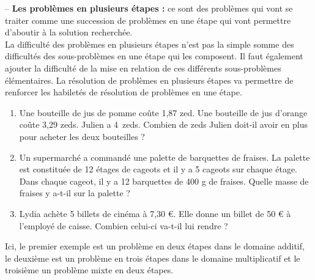    -- {\bf Les problèmes en plusieurs étapes :} ce sont des problèmes qui vont se traiter comme une succession de problèmes en une étape qui vont permettre d’aboutir à la solution recherchée. \\
      La difficulté des problèmes en plusieurs étapes n’est pas la simple somme des difficultés des sous-problèmes en une étape qui les composent. Il faut également ajouter la difficulté de la mise en relation de ces différents sous-problèmes élémentaires. La résolution de problèmes en plusieurs étapes va permettre de renforcer les habiletés de résolution de problèmes en une étape.
      \begin{exemple*1}
         {\small
         \begin{enumerate}
            \item Une bouteille de jus de pomme coûte 1,87 zed. Une bouteille de jus d’orange coûte 3,29 zeds. Julien a 4~zeds. Combien de zeds Julien doit-il avoir en plus pour acheter les deux bouteilles ?
            \item Un supermarché a commandé une palette de barquettes de fraises. La palette est constituée de 12 étages de cageots et il y a 5 cageots sur chaque étage. Dans chaque cageot, il y a 12 barquettes de 400 g de fraises. Quelle masse de fraises y a-t-il sur la palette ?
            \item Lydia achète 5 billets de cinéma à 7,30 \euro. Elle donne un billet de 50 \euro{} à l’employé de caisse. Combien celui-ci va-t-il lui rendre ? \\ [-10mm]
         \end{enumerate}}
      \end{exemple*1} \medskip
      
      Ici, le premier exemple est un problème en deux étapes dans le domaine additif, le deuxième est un problème en trois étapes dans le domaine multiplicatif et le troisième un problème mixte en deux étapes. \\
      
